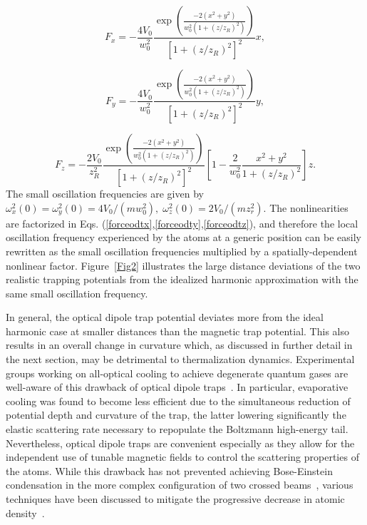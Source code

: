 \documentclass[pra,letterpaper,onecolumn,superscriptaddress,floatfix]{revtex4}
\begin{document}
\begin{equation}
F_x=-\frac{4V_0}{w_0^2} \frac{\exp\left(\frac{-2(x^2+y^2)}{w_0^2(1+(z/z_R)^2)}\right)}
{[1+(z/z_R)^2]^2}x,
\tag{7a}
\label{forceodtx}
\end{equation}

\begin{equation}
F_y=-\frac{4V_0}{w_0^2} \frac{\exp\left(\frac{-2(x^2+y^2)}{w_0^2(1+(z/z_R)^2)}\right)}
{[1+(z/z_R)^2]^2}y,
\tag{7b}
\label{forceodty}
\end{equation}

\begin{equation}
F_z=-\frac{2 V_0}{z_R^2} \frac{\exp\left(\frac{-2(x^2+y^2)}{w_0^2(1+(z/z_R)^2)}\right)}
{[1+(z/z_R)^2]^2} \left[1- \frac{2}{w_0^2} \frac{x^2+y^2}{1+(z/z_R)^2}\right] z.
\tag{7c}
\label{forceodtz}
\end{equation} 
The small oscillation frequencies are given by
$\omega_x^2(0)=\omega_y^2(0)=4 V_0/(m w_0^2), \; \omega_z^2(0)=2 V_0/(m z_r^2)$.
The nonlinearities are factorized in Eqs. (\ref{forceodtx},\ref{forceodty},\ref{forceodtz}), and therefore the
local oscillation frequency experienced by the atoms at a generic position can be easily rewritten as the small 
oscillation frequencies multiplied by a spatially-dependent nonlinear factor. 
Figure~\ref{Fig2} illustrates the large distance deviations of the two realistic trapping potentials 
from the idealized harmonic approximation with the same small oscillation frequency. 

In general, the optical dipole trap potential deviates more from the ideal harmonic case at smaller 
distances than the magnetic trap potential. This also results in an overall change in curvature which, as 
discussed in further detail in the next section, may be detrimental to thermalization dynamics. 
Experimental groups working on all-optical cooling to achieve degenerate quantum gases are well-aware 
of this drawback of optical dipole traps~\cite{Adams}. In particular, evaporative cooling was found to become less efficient 
due to the simultaneous reduction of potential depth and curvature of the trap, the latter lowering significantly the 
elastic scattering rate necessary to repopulate the Boltzmann high-energy tail. Nevertheless, optical dipole traps are 
convenient especially as they allow for the independent use of tunable magnetic fields to control the scattering 
properties of the atoms. While this drawback has not prevented achieving Bose-Einstein condensation in the more complex 
configuration of two crossed beams~\cite{Barrett}, various techniques have been discussed to mitigate the progressive 
decrease in atomic density~\cite{Cennini,Kinoshita,Hung,Clement,Arnold}.
\end{document}
